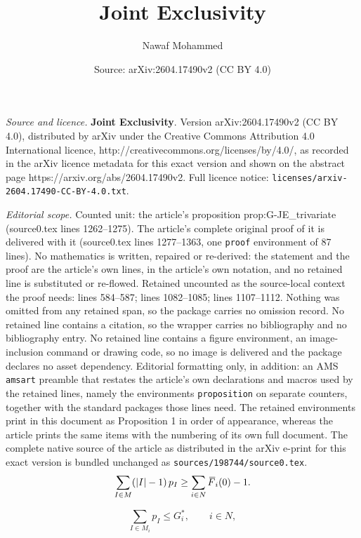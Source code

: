 \documentclass[10pt,a4paper]{amsart}
\title{\Large\textbf{{Joint Exclusivity}}}
\author{Nawaf Mohammed}
\date{Source: arXiv:2604.17490v2 (CC BY 4.0)}
\newcommand{\F}{\,\overline{\kern-0.175em F\kern-0em}}
\newcommand{\I}{{I}}
\newcommand{\M}{{M}}
\newcommand{\N}{{N}}
\begin{document}
\maketitle

\noindent\emph{Source and licence.} \Large\textbf{{Joint Exclusivity}}. Version arXiv:2604.17490v2 (CC BY 4.0), distributed by arXiv under the Creative Commons Attribution 4.0 International licence, http://creativecommons.org/licenses/by/4.0/, as recorded in the arXiv licence metadata for this exact version and shown on the abstract page https://arxiv.org/abs/2604.17490v2. Full licence notice: \texttt{licenses/arxiv-2604.17490-CC-BY-4.0.txt}.\par\smallskip

\noindent\textit{Editorial scope.} Counted unit: the article's proposition prop:G-JE\_trivariate (source0.tex lines 1262--1275). The article's complete original proof of it is delivered with it (source0.tex lines 1277--1363, one \texttt{proof} environment of 87 lines). No mathematics is written, repaired or re-derived: the statement and the proof are the article's own lines, in the article's own notation, and no retained line is substituted or re-flowed.  Retained uncounted as the source-local context the proof needs: lines 584--587; lines 1082--1085; lines 1107--1112.  Nothing was omitted from any retained span, so the package carries no omission record.  No retained line contains a citation, so the wrapper carries no bibliography and no bibliography entry.  No retained line contains a figure environment, an image-inclusion command or drawing code, so no image is delivered and the package declares no asset dependency.  Editorial formatting only, in addition: an AMS \texttt{amsart} preamble that restates the article's own declarations and macros used by the retained lines, namely the environments \texttt{proposition} on separate counters, together with the standard packages those lines need.  The retained environments print in this document as Proposition 1 in order of appearance, whereas the article prints the same items with the numbering of its own full document.  The complete native source of the article as distributed in the arXiv e-print for this exact version is bundled unchanged as \texttt{sources/198744/source0.tex}.
\begin{equation}
\label{eq:JE_parameters_2}
\sum_{\I\in\M}(|\I|-1)\,p_{\I}\ge \sum_{i\in\N}\F_i(0)-1.
\end{equation}

\begin{equation}
\label{eq:G-JE_parameters_1}
\sum_{\I\in \M_i}p_{\I}\le G_i^*, \qquad i\in\N,
\end{equation}
\end{document}
